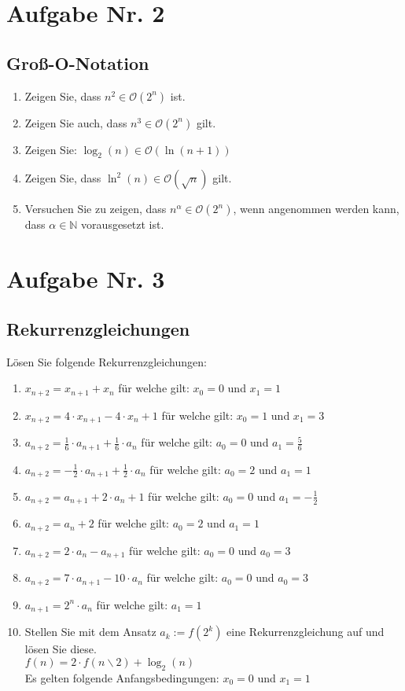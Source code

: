\documentclass[12px,a4paper]{article}
\begin{document}
\newpage
\section*{Aufgabe Nr. 2}
\subsection*{Groß-O-Notation}
\begin{enumerate}
	\item Zeigen Sie, dass $n^2 \in \mathcal{O}(2^n)$ ist.
	\item Zeigen Sie auch, dass $n^3 \in \mathcal{O}(2^n)$ gilt.
	\item Zeigen Sie: $ \log_2(n) \in \mathcal{O}(\ln(n+1)) $
	
	\item Zeigen Sie, dass $\ln^2 (n) \in \mathcal{O}(\sqrt{n})$ gilt.
	\item Versuchen Sie zu zeigen, dass $n^{\alpha} \in \mathcal{O}(2^n)$, wenn angenommen werden kann, dass $\alpha \in \mathbb{N}$ vorausgesetzt ist.
\end{enumerate}
\newpage
\section*{Aufgabe Nr. 3}
\subsection*{Rekurrenzgleichungen}
Lösen Sie folgende Rekurrenzgleichungen: \\
\begin{enumerate}
	\item $x_{n+2}=x_{n+1} + x_n$ für welche gilt:	$x_0 = 0$ und $x_1 =1$
	\item $x_{n+2}=4 \cdot x_{n+1} - 4 \cdot x_n +1$ für welche gilt:	$x_0=1$ und $x_1=3$
	\item $a_{n+2} = \frac{1}{6} \cdot a_{n+1} + \frac{1}{6} \cdot a_n$ für welche gilt:	$a_0 = 0$ und $a_1 = \frac{5}{6}$
	\item $a_{n+2} = -\frac{1}{2} \cdot a_{n+1} + \frac{1}{2} \cdot a_n$ für welche gilt: $a_0 = 2$ und $a_1 = 1$
	\item $a_{n+2} = a_{n+1} + 2 \cdot a_n +1$ für welche gilt:	$a_0 = 0$ und $a_1 = - \frac{1}{2}$
	\item $a_{n+2} = a_n +2$ für welche gilt:	$a_0 = 2$ und $a_1 = 1$
	\item $a_{n+2} = 2 \cdot a_n - a_{n+1}$ für welche gilt:	$a_0 = 0$ und $a_0 = 3$
	\item $a_{n+2} = 7 \cdot a_{n+1} - 10 \cdot a_n$ für welche gilt:	$a_0 = 0$ und $a_0 = 3$
	\item $a_{n+1} = 2^n \cdot a_n$ für welche gilt: $a_1 = 1$
	\item Stellen Sie mit dem Ansatz $a_k := f(2^k)$ eine Rekurrenzgleichung auf und lösen Sie diese.\\ 
			\noindent\hspace*{5mm} $f(n) = 2 \cdot f(n\backslash 2) + \log_2(n)$ \\
			Es gelten folgende Anfangsbedingungen:	$x_0 = 0$ und $x_1 = 1$
\end{enumerate}
\newpage
\end{document}
